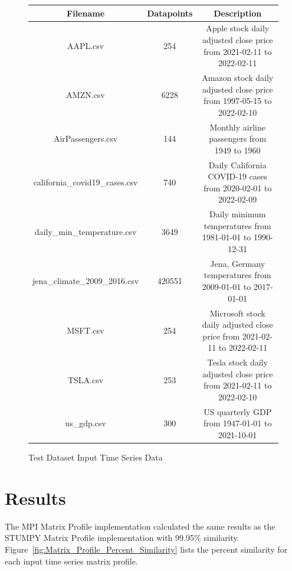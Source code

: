 \documentclass[conference]{IEEEtran}
\begin{document}
\begin{center}
\begin{figure}
\caption{Test Dataset Input Time Series Data}
\begin{tabular}{|c|c|c|}
\hline
\textbf{Filename} & \textbf{Datapoints} & \textbf{Description} \\ \hline \hline
AAPL.csv & 254 & Apple stock daily adjusted close price from 2021-02-11 to 2022-02-11 \\ \hline
AMZN.csv & 6228 & Amazon stock daily adjusted close price from 1997-05-15 to 2022-02-10 \\ \hline
AirPassengers.csv & 144 & Monthly airline passengers from 1949 to 1960 \\ \hline
california\_covid19\_cases.csv & 740 & Daily California COVID-19 cases from 2020-02-01 to 2022-02-09 \\ \hline
daily\_min\_temperature.csv & 3649 & Daily minimum temperatures from 1981-01-01 to 1990-12-31  \\ \hline
jena\_climate\_2009\_2016.csv & 420551 & Jena, Germany temperatures from 2009-01-01 to 2017-01-01  \\ \hline
MSFT.csv & 254 & Microsoft stock daily adjusted close price from 2021-02-11 to 2022-02-11 \\ \hline
TSLA.csv & 253 & Tesla stock daily adjusted close price from 2021-02-11 to 2022-02-10 \\ \hline
us\_gdp.csv & 300 & US quarterly GDP from 1947-01-01 to 2021-10-01 \\ \hline
\hline
\end{tabular}
\label{fig:Input_Time_Series}
\end{figure}
\end{center}

\section{Results}

The MPI Matrix Profile implementation calculated the same results as the STUMPY Matrix Profile implementation with 99.95\% similarity.  Figure~\ref{fig:Matrix_Profile_Percent_Similarity} lists the percent similarity for each input time series matrix profile. 
\end{document}

